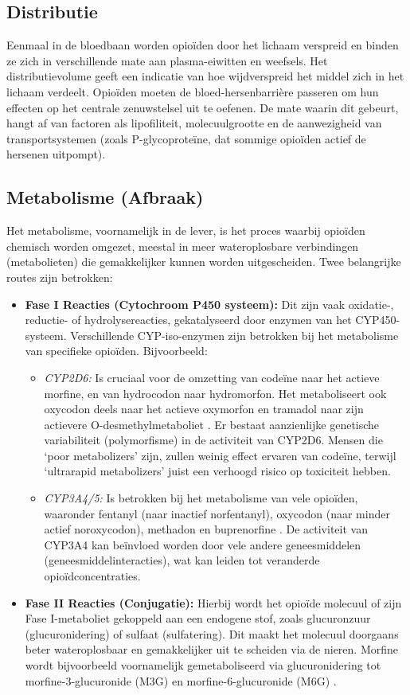 \documentclass[11pt, a4paper]{report} %
\begin{document}
\subsection{Distributie}
Eenmaal in de bloedbaan worden opioïden door het lichaam verspreid en binden ze zich in verschillende mate aan plasma-eiwitten en weefsels. Het distributievolume geeft een indicatie van hoe wijdverspreid het middel zich in het lichaam verdeelt. Opioïden moeten de bloed-hersenbarrière passeren om hun effecten op het centrale zenuwstelsel uit te oefenen. De mate waarin dit gebeurt, hangt af van factoren als lipofiliteit, molecuulgrootte en de aanwezigheid van transportsystemen (zoals P-glycoproteïne, dat sommige opioïden actief de hersenen uitpompt).

\subsection{Metabolisme (Afbraak)}
Het metabolisme, voornamelijk in de lever, is het proces waarbij opioïden chemisch worden omgezet, meestal in meer wateroplosbare verbindingen (metabolieten) die gemakkelijker kunnen worden uitgescheiden. Twee belangrijke routes zijn betrokken:
\begin{itemize}
    \item \textbf{Fase I Reacties (Cytochroom P450 systeem):} Dit zijn vaak oxidatie-, reductie- of hydrolysereacties, gekatalyseerd door enzymen van het CYP450-systeem. Verschillende CYP-iso-enzymen zijn betrokken bij het metabolisme van specifieke opioïden. Bijvoorbeeld:
        \begin{itemize}
            \item \textit{CYP2D6:} Is cruciaal voor de omzetting van codeïne naar het actieve morfine, en van hydrocodon naar hydromorfon. Het metaboliseert ook oxycodon deels naar het actieve oxymorfon en tramadol naar zijn actievere O-desmethylmetaboliet \parencite{PMC2019OxycodonePathway}. Er bestaat aanzienlijke genetische variabiliteit (polymorfisme) in de activiteit van CYP2D6. Mensen die `poor metabolizers' zijn, zullen weinig effect ervaren van codeïne, terwijl `ultrarapid metabolizers' juist een verhoogd risico op toxiciteit hebben.
            \item \textit{CYP3A4/5:} Is betrokken bij het metabolisme van vele opioïden, waaronder fentanyl (naar inactief norfentanyl), oxycodon (naar minder actief noroxycodon), methadon en buprenorfine \parencite{PMC2019OxycodonePathway, PubMed1997FentanylMetabolism}. De activiteit van CYP3A4 kan beïnvloed worden door vele andere geneesmiddelen (geneesmiddelinteracties), wat kan leiden tot veranderde opioïdconcentraties.
        \end{itemize}
    \item \textbf{Fase II Reacties (Conjugatie):} Hierbij wordt het opioïde molecuul of zijn Fase I-metaboliet gekoppeld aan een endogene stof, zoals glucuronzuur (glucuronidering) of sulfaat (sulfatering). Dit maakt het molecuul doorgaans beter wateroplosbaar en gemakkelijker uit te scheiden via de nieren. Morfine wordt bijvoorbeeld voornamelijk gemetaboliseerd via glucuronidering tot morfine-3-glucuronide (M3G) en morfine-6-glucuronide (M6G) \parencite{Frontiers2022M3G}.
\end{itemize}
\end{document}
